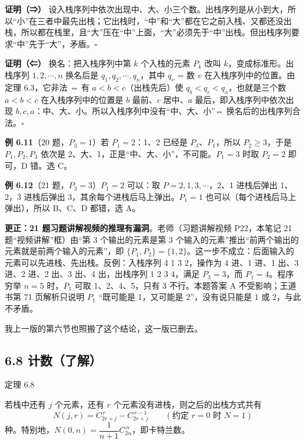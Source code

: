 \documentclass[10.5pt,a4paper,oneside]{article}
\newcommand{\cueblock}[2]{\Needspace{4\baselineskip}\leavevmode#1{#2}\par\vspace{-\baselineskip}\vspace{-\parskip}}
\newcommand{\cuebox}[1]{\leavevmode\llap{\smash{\begin{minipage}[t]{\marginparwidth}\raggedright\small\linespread{1.18}\selectfont #1\end{minipage}}\hspace{\marginparsep}}}
\newcommand{\cuenote}[1]{\cuebox{{\color{wdblue}\bfseries Q\,}\color{wddark}#1}}
\begin{document}
\textbf{证明（⇒）}
设入栈序列中依次出现中、大、小三个数。出栈序列是从小到大，所以“小”在三者中最先出栈；它出栈时，“中”和“大”都在它之前入栈、又都还没出栈，所以都在栈里，且“大”压在“中”上面，“大”必须先于“中”出栈。但出栈序列要求“中”先于“大”，矛盾。\(\square\)

\textbf{证明（⇐）} 换名：把入栈序列中第 \(k\) 个入栈的元素 \(P_k\) 改叫
\(k\)，变成标准形。出栈序列 \(1,2,\cdots,n\) 换名后是
\(q_1,q_2,\cdots,q_n\)，其中 \(q_v\) = 数 \(v\)
在入栈序列中的位置。由定理 6.3，它非法 ⇔ 有 \(a<b<c\)（出栈先后）使
\(q_b<q_c<q_a\)，也就是三个数 \(a<b<c\) 在入栈序列中的位置是 \(b\)
最前、\(c\) 居中、\(a\) 最后，即入栈序列中依次出现
\(b,c,a\)：中、大、小。所以入栈序列中没有“中、大、小”⇔
换名后的出栈序列合法。\(\square\)

\textbf{例 6.11}（20 题，\(P_3=1\)）若 \(P_1=2\)：1、2 已经是
\(P_3\)、\(P_1\)，所以 \(P_2\ge3\)，于是 \(P_1,P_2,P_3\) 依次是
2、大、1，正是“中、大、小”，不可能。\(P_1=3\) 时取 \(P_2=2\) 即可，D
错。选 C。

\textbf{例 6.12}（21 题，\(P_3=3\)）\(P_1=2\) 可以：取
\(P=2,1,3,\cdots\)，2、1 进栈后弹出 1、2，3 进栈后弹出
3，其余每个进栈后马上弹出。\(P_1=1\) 也可以（每个进栈后马上弹出），所以
B、C、D 都错，选 A。

\begin{fixbox}

\textbf{更正：21 题习题讲解视频的推理有漏洞}。老师（习题讲解视频
P22，本笔记 21 题“视频讲解”框）由“第 3 个输出的元素是第 3
个输入的元素”推出“前两个输出的元素就是前两个输入的元素”，即
\(\{P_1,P_2\}=\{1,2\}\)。这一步不成立：后面输入的元素可以先进栈、先出栈。反例：入栈序列
4 1 3 2，操作为 4 进、1 进、1 出、3 进、2 进、2 出、3 出、4 出，出栈序列
1 2 3 4，满足 \(P_3=3\)，而 \(P_1=4\)。程序穷举 \(n=5\) 时，\(P_1\) 可取
1、2、4、5，只有 3 不行。本题答案 A 不受影响；王道书第 71 页解析只说明
\(P_1\) “既可能是 1，又可能是 2”，没有说只能是 1 或 2，与此不矛盾。

我上一版的第六节也照搬了这个结论，这一版已删去。

\end{fixbox}

\hypertarget{ux8ba1ux6570ux4e86ux89e3}{%
\subsection{6.8 计数（了解）}\label{ux8ba1ux6570ux4e86ux89e3}}

\cueblock{\cuenote}{\relax{指定开头的出栈序列有几种，怎么算？}}

\begin{thmbox}{定理 6.8}

若栈中还有 \(j\) 个元素，还有 \(r\) 个元素没有进栈，则之后的出栈方式共有
\[N(j,r)=C_{2r+j}^{\,r}-C_{2r+j}^{\,r-1}\qquad(\text{约定 }r=0\text{ 时 }N=1)\]
种。特别地，\(N(0,n)=\dfrac{1}{n+1}C_{2n}^{\,n}\)，即卡特兰数。

\end{thmbox}
\end{document}
